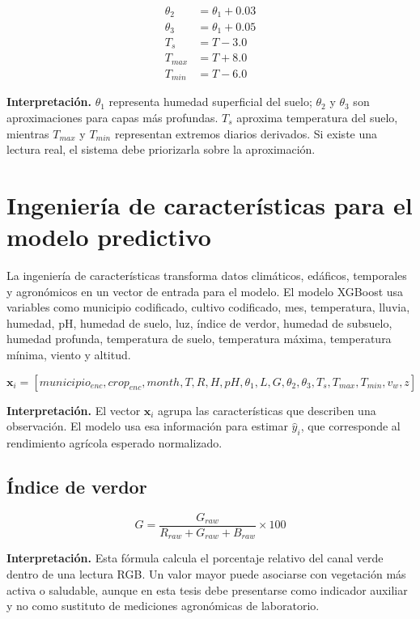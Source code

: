 \documentclass[12pt,letterpaper,oneside]{report}
\begin{document}
\begin{align}
\theta_2 &= \theta_1 + 0.03 \\
\theta_3 &= \theta_1 + 0.05 \\
T_s &= T - 3.0 \\
T_{max} &= T + 8.0 \\
T_{min} &= T - 6.0
\end{align}

\textbf{Interpretación.} $\theta_1$ representa humedad superficial del suelo; $\theta_2$ y $\theta_3$ son aproximaciones para capas más profundas. $T_s$ aproxima temperatura del suelo, mientras $T_{max}$ y $T_{min}$ representan extremos diarios derivados. Si existe una lectura real, el sistema debe priorizarla sobre la aproximación.

\section{Ingeniería de características para el modelo predictivo}
La ingeniería de características transforma datos climáticos, edáficos, temporales y agronómicos en un vector de entrada para el modelo. El modelo XGBoost usa variables como municipio codificado, cultivo codificado, mes, temperatura, lluvia, humedad, pH, humedad de suelo, luz, índice de verdor, humedad de subsuelo, humedad profunda, temperatura de suelo, temperatura máxima, temperatura mínima, viento y altitud.

\begin{equation}
\mathbf{x}_i = [municipio_{enc}, crop_{enc}, month, T, R, H, pH, \theta_1, L, G, \theta_2, \theta_3, T_s, T_{max}, T_{min}, v_w, z]
\end{equation}

\textbf{Interpretación.} El vector $\mathbf{x}_i$ agrupa las características que describen una observación. El modelo usa esa información para estimar $\hat{y}_i$, que corresponde al rendimiento agrícola esperado normalizado.

\subsection{Índice de verdor}
\begin{equation}
G = \frac{G_{raw}}{R_{raw}+G_{raw}+B_{raw}} \times 100
\end{equation}

\textbf{Interpretación.} Esta fórmula calcula el porcentaje relativo del canal verde dentro de una lectura RGB. Un valor mayor puede asociarse con vegetación más activa o saludable, aunque en esta tesis debe presentarse como indicador auxiliar y no como sustituto de mediciones agronómicas de laboratorio.
\end{document}
